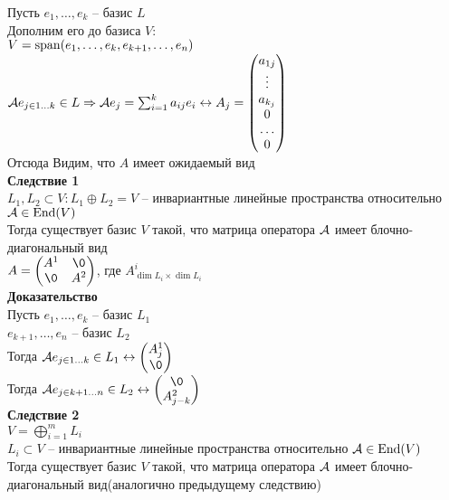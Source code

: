 \documentclass[12pt]{article}
\begin{document}
Пусть $e_1, \ldots, e_k$ -- базис $L$\\
Дополним его до базиса $V$:\\
$V = \operatorname{span} (e_1, \ldots, e_k, e_{k+1}, \ldots, e_n)$\\
$\mathcal{A} e_{j\in 1\ldots k} \in L \Rightarrow \mathcal{A} e_j = \sum_{i=1}^k a_{ij}e_i \leftrightarrow A_j = \begin{pmatrix}
    a_{1j}\\
    \vdots\\
    a_{k_j}\\
    0\\
    \ldots\\
    0
\end{pmatrix}$\\
Отсюда Видим, что $A$ имеет ожидаемый вид\\
\textbf{Следствие 1}\\
$L_1, L_2 \subset V: L_1\oplus L_2 = V$ -- инвариантные линейные пространства относительно $\mathcal{A} \in \operatorname{End}(V)$\\
Тогда существует базис $V$ такой, что матрица оператора $\mathcal{A}$ имеет блочно-диагональный вид\\
$A = \begin{pmatrix}
    A^1 & \0\\
    \0 & A^2
\end{pmatrix}$, где $A^i_{\dim L_i\times \dim L_i}$\\
\textbf{Доказательство}\\
Пусть $e_1, \ldots, e_k$ -- базис $L_1$\\
$e_{k+1}, \ldots, e_n$ -- базис $L_2$\\
Тогда $\mcA e_{j \in 1\ldots k} \in L_1 \lrto \begin{pmatrix}
    A^1_j\\\0
\end{pmatrix}$\\
Тогда $\mcA e_{j \in k+1\ldots n} \in L_2 \lrto \begin{pmatrix}
    \0\\A^2_{j-k}
\end{pmatrix}$\\
\textbf{Следствие 2}\\
$V = \bigoplus_{i=1}^m L_i$\\
$L_i \subset V$ -- инвариантные линейные пространства относительно $\mathcal{A} \in \operatorname{End}(V)$\\
Тогда существует базис $V$ такой, что матрица оператора $\mathcal{A}$ имеет блочно-диагональный вид(аналогично предыдущему следствию)\\
\end{document}
